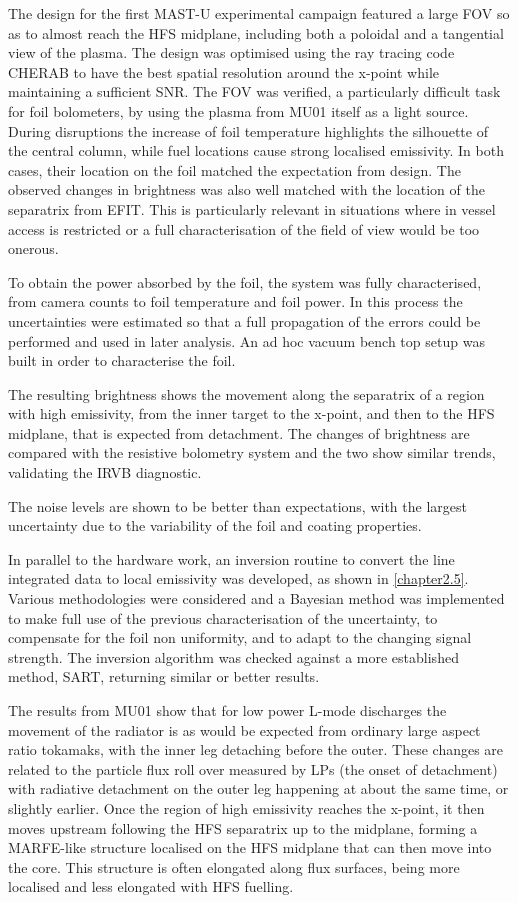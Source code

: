 The design for the first MAST-U experimental campaign featured a large FOV so as to almost reach the HFS midplane, including both a poloidal and a tangential view of the plasma. The design was optimised using the ray tracing code CHERAB to have the best spatial resolution around the x-point while maintaining a sufficient SNR. The FOV was verified, a particularly difficult task for foil bolometers, by using the plasma from MU01 itself as a light source. During disruptions the increase of foil temperature highlights the silhouette of the central column, while fuel locations cause strong localised emissivity. In both cases, their location on the foil matched the expectation from design. The observed changes in brightness was also well matched with the location of the separatrix from EFIT. This is particularly relevant in situations where in vessel access is restricted or a full characterisation of the field of view would be too onerous.


To obtain the power absorbed by the foil, the system was fully characterised, from camera counts to foil temperature and foil power. In this process the uncertainties were estimated so that a full propagation of the errors could be performed and used in later analysis. An ad hoc vacuum bench top setup was built in order to characterise the foil.



The resulting brightness shows the movement along the separatrix of a region with high emissivity, from the inner target to the x-point, and then to the HFS midplane, that is expected from detachment. The changes of brightness are compared with the resistive bolometry system and the two show similar trends, validating the IRVB diagnostic.

The noise levels are shown to be better than expectations, with the largest uncertainty due to the variability of the foil and coating properties.



In parallel to the hardware work, an inversion routine to convert the line integrated data to local emissivity was developed, as shown in \autoref{chapter2.5}. Various methodologies were considered and a Bayesian method was implemented to make full use of the previous characterisation of the uncertainty, to compensate for the foil non uniformity, and to adapt to the changing signal strength. The inversion algorithm was checked against a more established method, SART, returning similar or better results.


The results from MU01 show that for low power L-mode discharges the movement of the radiator is as would be expected from ordinary large aspect ratio tokamaks, with the inner leg detaching before the outer. These changes are related to the particle flux roll over measured by LPs (the onset of detachment) with radiative detachment on the outer leg happening at about the same time, or slightly earlier. Once the region of high emissivity reaches the x-point, it then moves upstream following the HFS separatrix up to the midplane, forming a MARFE-like structure localised on the HFS midplane that can then move into the core. This structure is often elongated along flux surfaces, being more localised and less elongated with HFS fuelling.

